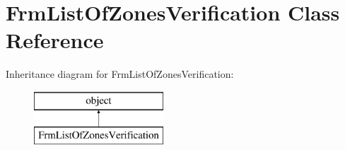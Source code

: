 \hypertarget{class_f_list_of_zones_verification_1_1_frm_list_of_zones_verification}{}\section{Frm\+List\+Of\+Zones\+Verification Class Reference}
\label{class_f_list_of_zones_verification_1_1_frm_list_of_zones_verification}
Inheritance diagram for Frm\+List\+Of\+Zones\+Verification\+:\begin{figure}[H]
\begin{center}
\leavevmode
\includegraphics[height=2.000000cm]{class_f_list_of_zones_verification_1_1_frm_list_of_zones_verification}
\end{center}
\end{figure}
